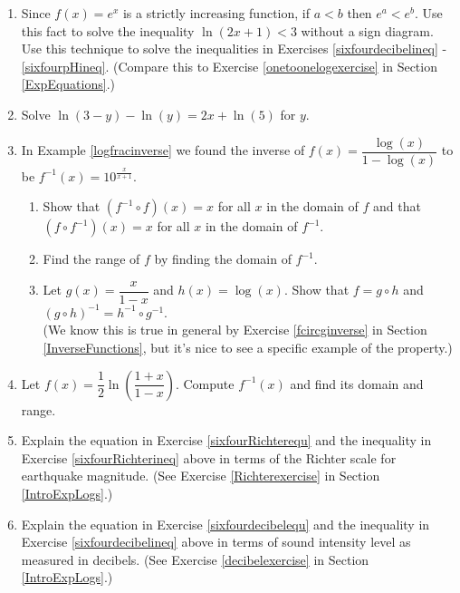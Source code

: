 \begin{enumerate}
\setcounter{enumi}{\value{HW}}

\item \label{onetooneexpexercise} Since $f(x) = e^{x}$ is a strictly increasing function, if $a < b$ then $e^{a} < e^{b}$.  Use this fact to solve the inequality $\ln(2x + 1) < 3$ without a sign diagram. Use this technique to solve the inequalities in Exercises \ref{sixfourdecibelineq} - \ref{sixfourpHineq}. (Compare this to Exercise  \ref{onetoonelogexercise} in Section \ref{ExpEquations}.)

\item Solve $\ln(3 - y) - \ln(y) = 2x + \ln(5)$ for $y$.

\item In Example \ref{logfracinverse} we found the inverse of $f(x) = \dfrac{\log(x)}{1-\log(x)}$ to be $f^{-1}(x) = 10^{\frac{x}{x+1}}$.

\begin{enumerate}

\item Show that $\left(f^{-1} \circ f\right)(x) = x$ for all $x$ in the domain of $f$ and that $\left(f \circ f^{-1}\right)(x) = x$ for all $x$ in the domain of $f^{-1}$.

\item Find the range of $f$ by finding the domain of $f^{-1}$.

\item Let $g(x) = \dfrac{x}{1 - x}$ and $h(x) = \log(x)$.  Show that $f = g \circ h$ and $(g \circ h)^{-1} = h^{-1} \circ g^{-1}$.\\
(We know this is true in general by Exercise \ref{fcircginverse} in Section \ref{InverseFunctions}, but it's nice to see a specific example of the property.)

\end{enumerate}

\item \label{inversehyptangent} Let $f(x) = \dfrac{1}{2}\ln\left(\dfrac{1 + x}{1 - x}\right)$.  Compute $f^{-1}(x)$ and find its domain and range.

\item Explain the equation in Exercise \ref{sixfourRichterequ} and the inequality in Exercise \ref{sixfourRichterineq} above in terms of the Richter scale for earthquake magnitude.  (See Exercise \ref{Richterexercise} in Section \ref{IntroExpLogs}.)

\item Explain the equation in Exercise \ref{sixfourdecibelequ} and the inequality in Exercise \ref{sixfourdecibelineq} above in terms of sound intensity level as measured in decibels.  (See Exercise \ref{decibelexercise} in Section \ref{IntroExpLogs}.)


\end{enumerate}
